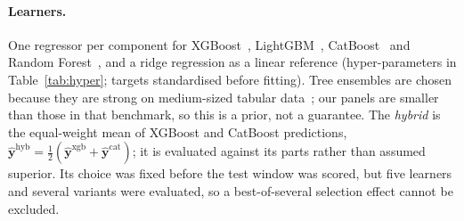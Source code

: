 \paragraph{Learners.} One regressor per component for XGBoost~\cite{chen2016xgboost}, LightGBM~\cite{ke2017}, CatBoost~\cite{prokhorenkova2018} and Random Forest~\cite{breiman2001}, and a ridge regression as a linear reference (hyper-parameters in Table~\ref{tab:hyper}; targets standardised before fitting). Tree ensembles are chosen because they are strong on medium-sized tabular data~\cite{grinsztajn2022}; our panels are smaller than those in that benchmark, so this is a prior, not a guarantee. The \emph{hybrid} is the equal-weight mean of XGBoost and CatBoost predictions, $\hat{\mathbf{y}}^{\text{hyb}}=\tfrac12(\hat{\mathbf{y}}^{\text{xgb}}+\hat{\mathbf{y}}^{\text{cat}})$; it is evaluated against its parts rather than assumed superior. Its choice was fixed before the test window was scored, but five learners and several variants were evaluated, so a best-of-several selection effect cannot be excluded.

